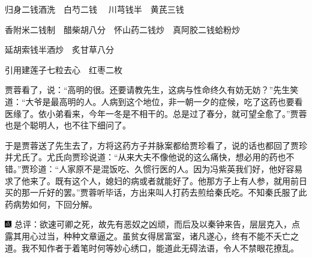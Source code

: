 \hspace{2em}归身{\small 二钱酒洗}　白芍{\small 二钱} 　川芎{\small 钱半}　黄芪{\small 三钱}

\hspace{2em}香附米{\small 二钱制}　醋柴胡{\small 八分}　怀山药{\small 二钱炒}　真阿胶{\small 二钱蛤粉炒}

\hspace{2em}延胡索{\small 钱半酒炒}　炙甘草{\small 八分}

\hspace{2em}引用建莲子七粒去心　红枣二枚

贾蓉看了，说：“高明的很。还要请教先生，这病与性命终久有妨无妨？”先生笑道：“大爷是最高明的人。人病到这个地位，非一朝一夕的症候，吃了这药也要看医缘了。依小弟看来，今年一冬是不相干的。总是过了春分，就可望全愈了。”贾蓉也是个聪明人，也不往下细问了。

于是贾蓉送了先生去了，方将这药方子并脉案都给贾珍看了，说的话也都回了贾珍并尤氏了。尤氏向贾珍说道：“从来大夫不像他说的这么痛快，想必用的药也不错。”贾珍道：“人家原不是混饭吃、久惯行医的人。因为冯紫英我们好，他好容易求了他来了。既有这个人，媳妇的病或者就能好了。他那方子上有人参，就用前日买的那一斤好的罢。”贾蓉听毕话，方出来叫人打药去煎给秦氏吃。不知秦氏服了此药病势如何，下回分解。

{\includegraphics[width=3mm]{../Images/00005} \kaishu  总评：欲速可卿之死，故先有恶奴之凶顽，而后及以秦钟来告，层层克入，点露其用心过当，种种文章逼之。虽贫女得居富室，诸凡遂心，终有不能不夭亡之道。我不知作者于着笔时何等妙心绣口，能道此无碍法语，令人不禁眼花撩乱。}